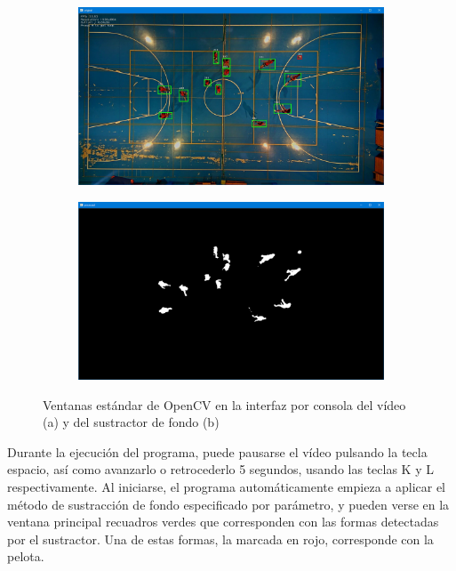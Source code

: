 \begin{figure}
\begin{subfigure}{.5\textwidth}
  \centering
  \includegraphics[width=.9\linewidth]{images/original}
  \caption { }
  \label{fig:ventanaoriginal}
\end{subfigure}%
\begin{subfigure}{.5\textwidth}
  \centering
  \includegraphics[width=.9\linewidth]{images/processed}
  \caption { }
  \label{fig:ventanaprocessed}
\end{subfigure}
\caption{Ventanas estándar de OpenCV en la interfaz por consola del vídeo (a) y del sustractor de fondo (b) }
\label{fig:ventanas}
\end{figure}

Durante la ejecución del programa, puede pausarse el vídeo pulsando la tecla espacio, así como avanzarlo o retrocederlo 5 segundos, usando las teclas K y L respectivamente. Al iniciarse, el programa automáticamente empieza a aplicar el método de sustracción de fondo especificado por parámetro, y pueden verse en la ventana principal recuadros verdes que corresponden con las formas detectadas por el sustractor. Una de estas formas, la marcada en rojo, corresponde con la pelota.


